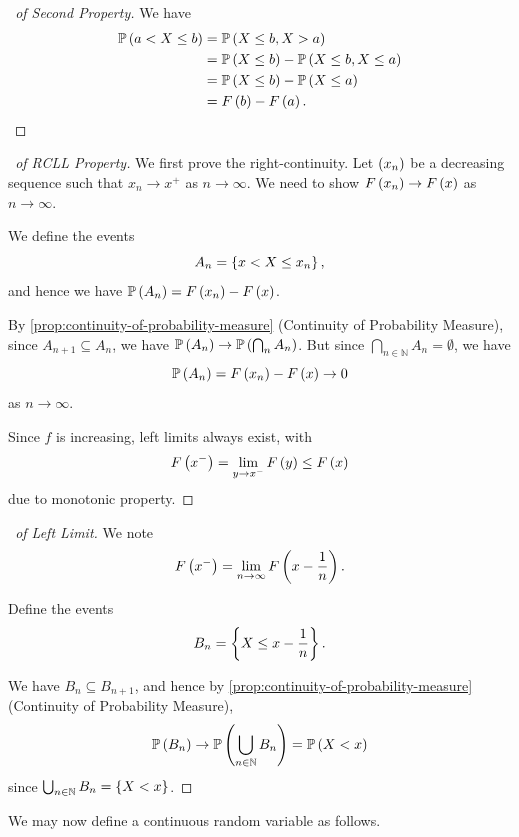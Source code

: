 \documentclass{article}
\theoremstyle{definition}
\theoremstyle{remark}
\newcommand{\NN}{\mathbb{N}}
\newcommand{\Prob}{\mathbb{P}}
\begin{document}
\begin{proof}[\proofname\ of Second Property]
    We have
    \begin{align*}
        \Prob\pqty{a < X \leq b} &= \Prob\pqty{X \leq b, X > a} \\
        &= \Prob\pqty{X \leq b} - \Prob\pqty{X \leq b, X \leq a} \\
        &= \Prob\pqty{X \leq b} - \Prob\pqty{X \leq a} \\
        &= F\pqty{b} - F\pqty{a}.
    \end{align*}
\end{proof}

\begin{proof}[\proofname\ of RCLL Property]
    We first prove the right-continuity. Let \(\left(x_n\right)\) be a decreasing sequence such that \(x_n \to x^+\) as \(n \to \infty\). We need to show \(F\left(x_n\right) \to F\left(x\right)\) as \(n \to \infty\).

    We define the events
    \[
        A_n = \left\{x < X \leq x_n\right\},
    \]
    and hence we have \(\Prob\pqty{A_n} = F\pqty{x_n} - F\pqty{x}\).

    By \autoref{prop:continuity-of-probability-measure} (Continuity of Probability Measure), since \(A_{n + 1} \subseteq A_n\), we have \(\Prob\pqty{A_n} \to \Prob\pqty{\bigcap_n A_n}\). But since \(\bigcap_{n \in \NN} A_n = \emptyset\), we have
    \[
        \Prob\pqty{A_n} = F\pqty{x_n} - F\pqty{x} \to 0
    \]
    as \(n \to \infty\).

    Since \(f\) is increasing, left limits always exist, with
    \[
        F\left(x^-\right) = \lim_{y \to x^-} F\left(y\right) \leq F\left(x\right)
    \]
    due to monotonic property.
\end{proof}

\begin{proof}[\proofname\ of Left Limit]
    We note
    \[
        F\left(x^-\right) = \lim_{n \to \infty} F\left(x - \frac{1}{n}\right).
    \]

    Define the events
    \[
        B_n = \left\{X \leq x - \frac{1}{n}\right\}.
    \]

    We have \(B_n \subseteq B_{n + 1}\), and hence by \autoref{prop:continuity-of-probability-measure} (Continuity of Probability Measure),
    \[
        \Prob\pqty{B_n} \to \Prob\pqty{\bigcup_{n \in \NN} B_n} = \Prob\pqty{X < x}
    \]
    since \(\bigcup_{n \in \NN} B_n = \Bqty{X < x}\).
\end{proof}

We may now define a continuous random variable as follows.
\end{document}
